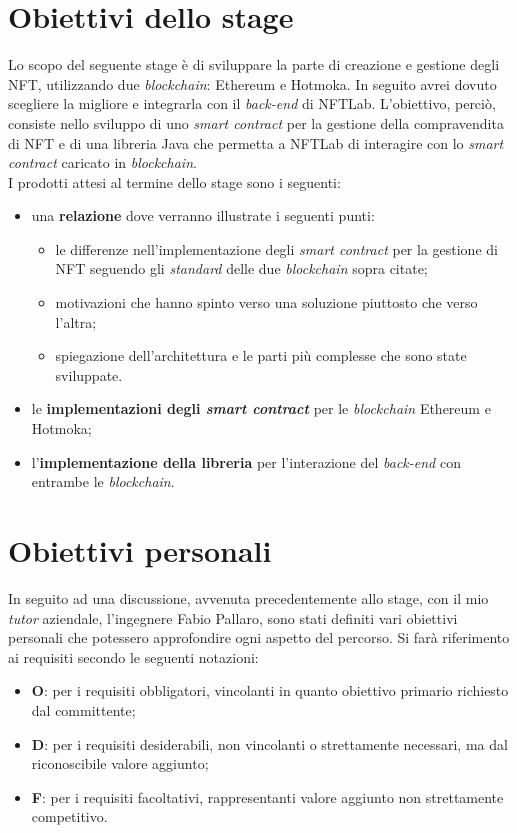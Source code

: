 
\section{Obiettivi dello stage}
Lo scopo del seguente stage è di sviluppare la parte di creazione e gestione degli NFT, utilizzando due \textit{blockchain}: Ethereum e Hotmoka. In seguito avrei dovuto scegliere la migliore e integrarla con il \textit{back-end} di NFTLab. L'obiettivo, perciò, consiste nello sviluppo di uno \textit{smart contract} per la gestione della compravendita di NFT e di una libreria Java che permetta a NFTLab di interagire con lo \textit{smart contract} caricato in \textit{blockchain}. \\

\noindent I prodotti attesi al termine dello stage sono i seguenti:
\begin{itemize}
  \item una \textbf{relazione} dove verranno illustrate i seguenti punti:
  \begin{itemize}
    \item le differenze nell'implementazione degli \textit{smart contract} per la gestione di NFT seguendo gli \textit{standard} delle due \textit{blockchain} sopra citate;
    \item motivazioni che hanno spinto verso una soluzione piuttosto che verso l'altra;
    \item spiegazione dell'architettura e le parti più complesse che sono state sviluppate.
  \end{itemize}
  \item le \textbf{implementazioni degli \textit{smart contract}} per le \textit{blockchain} Ethereum e Hotmoka;
  \item l'\textbf{implementazione della libreria} per l'interazione del \textit{back-end} con entrambe le \textit{blockchain}.
\end{itemize}

\section{Obiettivi personali}
In seguito ad una discussione, avvenuta precedentemente allo stage, con il mio \textit{tutor} aziendale, l'ingegnere Fabio Pallaro, sono stati definiti vari obiettivi personali che potessero approfondire ogni aspetto del percorso. Si farà riferimento ai requisiti secondo le seguenti notazioni:
\begin{itemize}
  \item \textbf{O}: per i requisiti obbligatori, vincolanti in quanto obiettivo primario richiesto dal committente;
  \item \textbf{D}: per i requisiti desiderabili, non vincolanti o strettamente necessari, ma dal riconoscibile valore aggiunto;
  \item \textbf{F}: per i requisiti facoltativi, rappresentanti valore aggiunto non strettamente competitivo.
\end{itemize}


